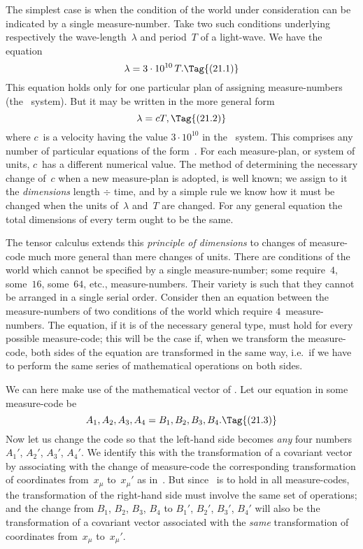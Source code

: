 \documentclass[12pt]{book}
\begin{document}
The simplest case is when the condition of the world under consideration
can be indicated by a single measure-number. Take two such conditions
underlying respectively the wave-length~$\lambda$ and period~$T$ of a light-wave. We
have the equation
\[
\lambda = 3 \cdot 10^{10}\, T.
\Tag{(21.1)}
\]
This equation holds only for one particular plan of assigning measure-numbers
(the \CGS\ system). But it may be written in the more general form
\[
\lambda = cT,
\Tag{(21.2)}
\]
where $c$~is a velocity having the value $3 \cdot 10^{10}$ in the \CGS\ system. This
comprises any number of particular equations of the form~. For each
measure-plan, or system of units, $c$~has a different numerical value. The
method of determining the necessary change of~$c$ when a new measure-plan
is adopted, is well known; we assign to it the \emph{dimensions} length $\div$ time, and
by a simple rule we know how it must be changed when the units of~$\lambda$ and~$T$
are changed. For any general equation the total dimensions of every term
ought to be the same.

The tensor calculus extends this \emph{principle of dimensions} to changes of
%
%
measure-code much more general than mere changes of units. There are
%
%
conditions of the world which cannot be specified by a single measure-number;
some require~$4$, some~$16$, some~$64$, etc., measure-numbers. Their variety is
such that they cannot be arranged in a single serial order. Consider then an
equation between the measure-numbers of two conditions of the world which
require $4$~measure-numbers. The equation, if it is of the necessary general type,
must hold for every possible measure-code; this will be the case if, when we
transform the measure-code, both sides of the equation are transformed in
the same way, i.e.\ if we have to perform the same series of mathematical
operations on both sides.

We can here make use of the mathematical vector of . Let our equation
in some measure-code be
\[
A_{1}, A_{2}, A_{3}, A_{4} = B_{1}, B_{2}, B_{3}, B_{4}.
\Tag{(21.3)}
\]
Now let us change the code so that the left-hand side becomes \emph{any} four
numbers $A_{1}'$, $A_{2}'$, $A_{3}'$, $A_{4}'$. We identify this with the transformation of a covariant
vector by associating with the change of measure-code the corresponding
transformation of coordinates from~$x_{\mu}$ to~$x_{\mu}'$ as in~. But since ~is
to hold in all measure-codes, the transformation of the right-hand side must
involve the same set of operations; and the change from $B_{1}$, $B_{2}$, $B_{3}$, $B_{4}$ to $B_{1}'$,
$B_{2}'$, $B_{3}'$, $B_{4}'$ will also be the transformation of a covariant vector associated
with the \emph{same} transformation of coordinates from~$x_{\mu}$ to~$x_{\mu}'$.
\end{document}
